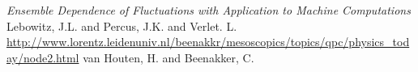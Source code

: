 %


\begin{thebibliography}{99}
\vspace*{0.2mm}
\emph{Ensemble Dependence of Fluctuations with Application to Machine Computations} Lebowitz, J.L. and Percus, J.K. and Verlet. L.
\vspace*{0.2mm}
\url{http://www.lorentz.leidenuniv.nl/beenakkr/mesoscopics/topics/qpc/physics_today/node2.html} van Houten, H. and  Beenakker, C.
\vspace*{0.2mm}



\end{thebibliography}




% 